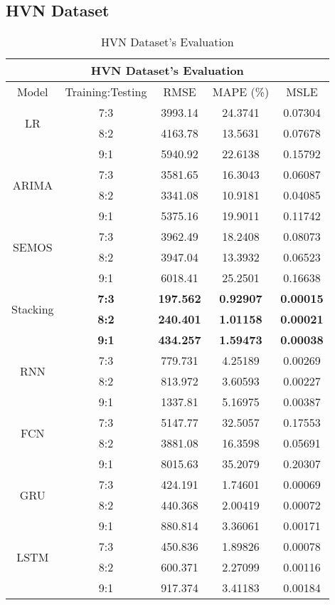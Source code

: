 \documentclass{ieeeojies}
\begin{document}
\subsection{HVN Dataset} 
\renewcommand{\arraystretch}{1.23}
\begin{table}[H]
    \centering
    \begin{tabular}{|c|c|c|c|c|}
         \hline
         \multicolumn{5}{|c|}{\textbf{HVN Dataset's Evaluation}}\\
         \hline
         \centering Model & Training:Testing & RMSE & MAPE (\%) & MSLE\\
         \hline
         \multirow{2}{*}{LR} & 7:3 & 3993.14 & 24.3741 & 0.07304 \\ & 8:2 & 4163.78 & 13.5631 & 0.07678 \\ & 9:1 & 5940.92 & 22.6138 & 0.15792\\
         \hline
         \multirow{2}{*}{ARIMA} & 7:3&3581.65&16.3043&0.06087\\ & 8:2&3341.08&10.9181&0.04085 \\ & 9:1 & 5375.16 & 19.9011 &0.11742\\
         \hline
         \multirow{2}{*}{SEMOS} & 7:3 & 3962.49 & 18.2408 & 0.08073 \\ & 8:2 & 3947.04 & 13.3932 & 0.06523 \\ & 9:1 & 6018.41  & 25.2501 & 0.16638\\
         \hline
         \multirow{2}{*}{Stacking} & \textbf{7:3} &  \textbf{197.562} & \textbf{0.92907} & \textbf{0.00015} \\ & \textbf{8:2} & \textbf{240.401} & \textbf{1.01158} & \textbf{0.00021} \\ & \textbf{9:1} & \textbf{434.257}  & \textbf{1.59473} & \textbf{0.00038}\\
         \hline
         \multirow{2}{*}{RNN} & 7:3	& 779.731 & 4.25189 & 0.00269 \\ & 8:2 & 813.972 & 3.60593 & 0.00227 \\ & 9:1 & 1337.81  & 5.16975 & 0.00387\\
         \hline
         \multirow{2}{*}{FCN} & 7:3 & 5147.77 & 32.5057 & 0.17553 \\ & 8:2 &	3881.08 & 16.3598 & 0.05691 \\ & 9:1 & 8015.63	& 35.2079 & 0.20307\\
         \hline
         \multirow{2}{*}{GRU} & 7:3 & 424.191 & 1.74601& 0.00069 \\ & 8:2 & 440.368 & 2.00419 & 0.00072 \\ & 9:1 &  880.814 & 3.36061 & 0.00171 \\
         \hline
         \multirow{2}{*}{LSTM} & 7:3 & 450.836 &  1.89826 &  0.00078 \\ & 8:2 & 600.371 &  2.27099 &  0.00116 \\ & 9:1 & 917.374 & 3.41183 & 0.00184\\
         \hline
    \end{tabular}
    \caption{HVN Dataset's Evaluation}
    \label{vcbresult}
\end{table}
\end{document}
